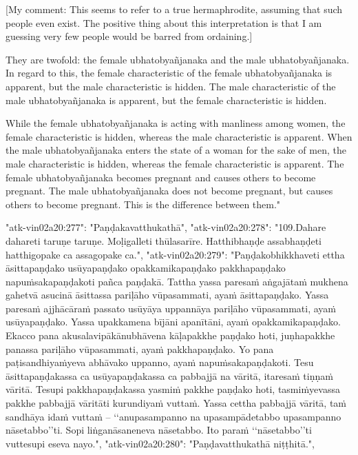 [My comment: This seems to refer to a true hermaphrodite, assuming that such people even exist. The positive thing about this interpretation is that I am guessing very few people would be barred from ordaining.] 

They are twofold: the female ubhatobyañjanaka and the male ubhatobyañjanaka. In regard to this, the female characteristic of the female ubhatobyañjanaka is apparent, but the male characteristic is hidden. The male characteristic of the male ubhatobyañjanaka is apparent, but the female characteristic is hidden. 

While the female ubhatobyañjanaka is acting with manliness among women, the female characteristic is hidden, whereas the male characteristic is apparent. 
When the male ubhatobyañjanaka enters the state of a woman for the sake of men, the male characteristic is hidden, whereas the female characteristic is apparent. 
The female ubhatobyañjanaka becomes pregnant and causes others to become pregnant. The male ubhatobyañjanaka does not become pregnant, but causes others to become pregnant. This is the difference between them."



  "atk-vin02a20:277": "Paṇḍakavatthukathā",
  "atk-vin02a20:278": "109.Dahare dahareti taruṇe taruṇe. Moḷigalleti thūlasarīre. Hatthibhaṇḍe assabhaṇḍeti hatthigopake ca assagopake ca.",
  "atk-vin02a20:279": "Paṇḍakobhikkhaveti ettha āsittapaṇḍako usūyapaṇḍako opakkamikapaṇḍako pakkhapaṇḍako napuṁsakapaṇḍakoti pañca paṇḍakā. Tattha yassa paresaṁ aṅgajātaṁ mukhena gahetvā asucinā āsittassa pariḷāho vūpasammati, ayaṁ āsittapaṇḍako. Yassa paresaṁ ajjhācāraṁ passato usūyāya uppannāya pariḷāho vūpasammati, ayaṁ usūyapaṇḍako. Yassa upakkamena bījāni apanītāni, ayaṁ opakkamikapaṇḍako. Ekacco pana akusalavipākānubhāvena kāḷapakkhe paṇḍako hoti, juṇhapakkhe panassa pariḷāho vūpasammati, ayaṁ pakkhapaṇḍako. Yo pana paṭisandhiyaṁyeva abhāvako uppanno, ayaṁ napuṁsakapaṇḍakoti. Tesu āsittapaṇḍakassa ca usūyapaṇḍakassa ca pabbajjā na vāritā, itaresaṁ tiṇṇaṁ vāritā. Tesupi pakkhapaṇḍakassa yasmiṁ pakkhe paṇḍako hoti, tasmiṁyevassa pakkhe pabbajjā vāritāti kurundiyaṁ vuttaṁ. Yassa cettha pabbajjā vāritā, taṁ sandhāya idaṁ vuttaṁ – ‘‘anupasampanno na upasampādetabbo upasampanno nāsetabbo’’ti. Sopi liṅganāsaneneva nāsetabbo. Ito paraṁ ‘‘nāsetabbo’’ti vuttesupi eseva nayo.",
  "atk-vin02a20:280": "Paṇḍavatthukathā niṭṭhitā.",

